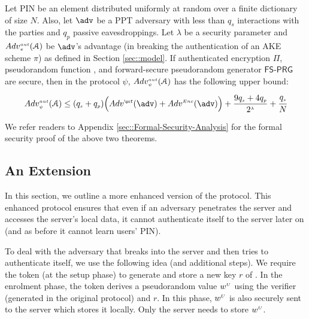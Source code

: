 \begin{theorem} [Authentication]
Let PIN be an element distributed uniformly at random over a finite dictionary of size $N$. Also, 
let $\adv$ be a PPT adversary with less than $q_s$ interactions with the parties and $q_p$ passive eavesdroppings. Let $\lambda$ be a security parameter and $Adv_{\scriptscriptstyle\pi}^{\scriptscriptstyle aut}(\mathcal{A})$ be  $\adv$'s advantage (in breaking the authentication of an AKE scheme $\pi$) as defined in Section \ref{sec::model}.  If authenticated encryption $\Pi$, pseudorandom function \prf,  and forward-secure pseudorandom generator  $\mathsf{FS\text{-}PRG}$ are secure, then in the protocol $\psi$, $Adv_{\scriptscriptstyle \psi}^{\scriptscriptstyle aut}(\mathcal{A})$ has the following upper bound:  
%
\vspace{-3mm}
  \begin{equation*}
 Adv_{\sss \psi}^{\sss aut}(\A)  \leq (q_{\sss s} + q_{\sss p})\Big(Adv^{\sss\prf}(\adv)+Adv^{\sss Enc}(\adv)\Big)+\frac{9q_{\sss s}+4q_{\sss p}}{2^{\sss\lambda}}+  \cfrac{q_{\sss s}}{N}
 \end{equation*}
%
\end{theorem}





We refer readers to Appendix \ref{sec::Formal-Security-Analysis} for the formal security proof of the above two theorems. 

\subsection{An Extension}


In this section, we outline a more enhanced version of the protocol. This enhanced protocol ensures that even if an adversary penetrates the server and accesses the server's local data, it cannot authenticate itself to the server later on (and as before it cannot learn users' PIN). 


To deal with the adversary that breaks into the server and then tries to authenticate itself, we use the following idea (and additional steps). We require the token (at the setup phase) to generate and store a new key $r$ of \prf.  In the enrolment phase, the token derives a pseudorandom value $w^{\scriptscriptstyle U}$ using the verifier \VC{\verifier} (generated in the original protocol) and $r$. In this phase, $w^{\scriptscriptstyle U}$ is also securely sent to the server which stores it locally. Only the server needs to store $w^{\scriptscriptstyle U}$. 

